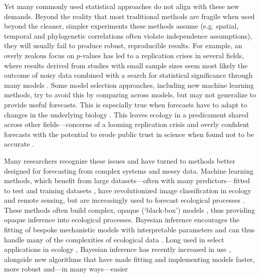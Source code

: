 \documentclass[11pt]{article}
\begin{document}
Yet many commonly used statistical approaches do not align with these new demands. Beyond the reality that most traditional methods are fragile when used beyond the cleaner, simpler experiments these methods assume (e.g. spatial, temporal and phylogenetic correlations often violate independence assumptions), they will usually fail to produce robust, reproducible results. For example, an overly zealous focus on $p$-values has led to a replication crises in several fields, where results derived from studies with small sample sizes seem most likely the outcome of noisy data combined with a search for statistical significance through many models \citep[effectively a garden of forking paths,][]{halsey2015,loken2017}. Some model selection approaches, including new machine learning methods, try to avoid this by comparing across models, but may not generalize to provide useful forecasts. This is especially true when forecasts have to adapt to changes in the underlying biology  \citep{boettiger2022forecast}. This leaves ecology in a predicament shared across other fields---concerns of a looming replication crisis \citep{filazzola2021replication,fraser2020role} and overly confident forecasts with the potential to erode public trust in science when found not to be accurate \citep{leroux2019prevalence,boettiger2022forecast}. 

Many researchers recognize these issues and have turned to methods better designed for forecasting from complex systems and messy data. Machine learning methods, which benefit from large datasets---often with many predictors---fitted to test and training datasets \citep{breiman2001statistical}, have revolutionized image classification in ecology and remote sensing, but are increasingly used to forecast ecological processes \citep[e.g.,][]{zwart2023near}. These methods often build complex, opaque (`black-box') models \citep{CoxTwoCultures,EfronTwoCultures,shmueli2010explain}, thus providing opaque inference into ecological processes. Bayesian inference encourages the fitting of bespoke mechanistic models with interpretable parameters and can thus handle many of the complexities of ecological data \citep{hobbs2006alternatives}. Long used in select applications in ecology \citep{muthuku2008,zheng2007,trijoulet2018,strinella2020potential}, Bayesian inference has recently increased in use \citep{anderson2021trends,pichler2023machine}, alongside new algorithms \citep[e.g. Hamiltonian Monte Carlo,][]{nuts2014,betan2019} that have made fitting and implementing models faster, more robust and---in many ways---easier \citep{Carpenter:2017stan}
\end{document}
